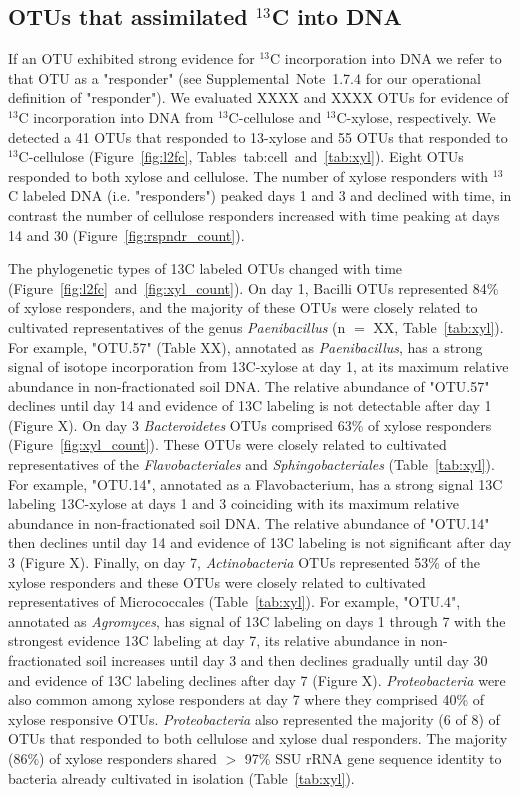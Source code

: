 \subsection{OTUs that assimilated $^{13}$C into DNA} \label{responders}
If an OTU exhibited strong evidence for $^{13}$C incorporation into DNA we
refer to that OTU as a "responder" (see Supplemental Note 1.7.4 for our
operational definition of "responder"). We evaluated XXXX and XXXX OTUs for
evidence of $^{13}$C incorporation into DNA from $^{13}$C-cellulose and
$^{13}$C-xylose, respectively. We detected a 41 OTUs that responded to
13-xylose and 55 OTUs that responded to $^{13}$C-cellulose (Figure~\ref{fig:l2fc}, 
Tables~{tab:cell}~and~\ref{tab:xyl}). Eight OTUs responded to both xylose and cellulose. The number of
xylose responders with $^{13}$C labeled DNA (i.e. "responders") peaked days
1 and 3 and declined with time, in contrast the number of cellulose responders
increased with time peaking at days 14 and 30 (Figure~\ref{fig:rspndr_count}). 

The phylogenetic types of 13C labeled OTUs changed with time (Figure~\ref{fig:l2fc}~and~\ref{fig:xyl_count}).
On day 1, Bacilli OTUs represented 84\% of xylose responders, and the
majority of these OTUs were closely related to cultivated representatives of
the genus \textit{Paenibacillus} (n $=$ XX, Table~\ref{tab:xyl}). For example, "OTU.57"
(Table XX), annotated as \textit{Paenibacillus}, has a strong signal of isotope
incorporation from 13C-xylose at day 1, at its maximum relative abundance in
non-fractionated soil DNA. The relative abundance of "OTU.57" declines until
day 14 and evidence of 13C labeling is not detectable after day 1 (Figure
X). On day 3 \textit{Bacteroidetes} OTUs comprised 63\% of xylose responders
(Figure~\ref{fig:xyl_count}). These OTUs were closely related to cultivated representatives of
the \textit{Flavobacteriales} and \textit{Sphingobacteriales} (Table~\ref{tab:xyl}). For
example, "OTU.14", annotated as a Flavobacterium, has a strong signal 13C
labeling 13C-xylose at days 1 and 3 coinciding with its maximum relative
abundance in non-fractionated soil DNA. The relative abundance of "OTU.14" then
declines until day 14 and evidence of 13C labeling is not significant after day
3 (Figure X). Finally, on day 7, \textit{Actinobacteria} OTUs represented 53\%
of the xylose responders and these OTUs were closely related to cultivated
representatives of Micrococcales (Table~\ref{tab:xyl}). For example, "OTU.4", annotated as
\textit{Agromyces}, has signal of 13C labeling on days 1 through 7 with the
strongest evidence 13C labeling at day 7, its relative abundance in
non-fractionated soil increases until day 3 and then declines gradually until
day 30 and evidence of 13C labeling declines after day 7 (Figure X).
\textit{Proteobacteria} were also common among xylose responders at day 7 where
they comprised 40\% of xylose responsive OTUs. \textit{Proteobacteria} also
represented the majority (6 of 8) of OTUs that responded to both cellulose and
xylose dual responders. The majority (86\%) of xylose responders shared $>$
97\% SSU rRNA gene sequence identity to bacteria already cultivated in
isolation (Table~\ref{tab:xyl}). 

